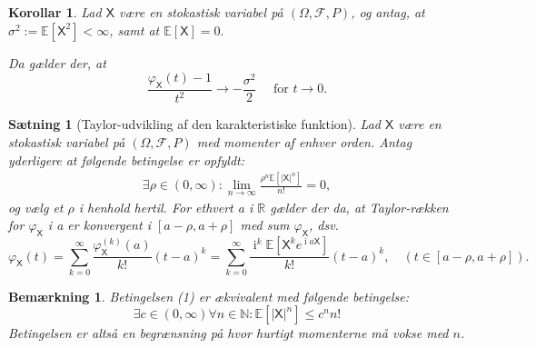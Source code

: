 \documentclass{article}
\newcommand{\N}{\mathbb{N}}
\newcommand{\R}{\mathbb{R}}
\newcommand{\E}{\mathbb{E}}
\newcommand{\1}{\mathbbm{1}}
\newcommand{\X}{\mathsf{X}}
\newcommand{\icomp}{\operatorname{i}}
\newcommand{\varx}{\varphi_\X}
\newcommand{\pfield}{(\Omega, \mathcal{F}, P)}
\newtheorem{corollary}[theorem]{Korollar}
\newtheorem{remark}[theorem]{Bemærkning}
\newtheorem{proposition}[theorem]{Sætning}
\theoremstyle{boxed}
\begin{document}
\begin{theorem-box}
    \begin{corollary}
        Lad $\X$ være en stokastisk variabel på $\pfield$, og antag, at $\sigma^2:=\E[\X^2]<\infty$, samt at $\E[\X]=0.$
        
        Da gælder der, at 
        $$\frac{\varx(t)-1}{t^2}\longrightarrow -\frac{\sigma^2}{2}\quad \text{ for }t\rightarrow 0.$$
    \end{corollary}
\end{theorem-box}
\begin{theorem-box}
    \begin{proposition}[Taylor-udvikling af den karakteristiske funktion]
        Lad $\X$ være en stokastisk variabel på $\pfield$ med momenter af enhver orden. Antag yderligere at følgende betingelse er opfyldt: 
        \begin{align}\exists\rho\in(0,\infty):\lim_{n\rightarrow\infty}\frac{\rho^n\E[|\X|^n]}{n!}=0,\end{align}
        og vælg et $\rho$ i henhold hertil. For ethvert a i $\R$ gælder der da, at Taylor-rækken for $\varx$ i a er konvergent i $[a-\rho, a+\rho]$ med sum $\varx$, dsv.
        $$\varx(t)=\sum_{k=0}^{\infty}\frac{\varx^{(k)}(a)}{k!}(t-a)^k=\sum_{k=0}^{\infty}\frac{\icomp^k\E[\X^ke^{\icomp a\X}]}{k!}(t-a)^k, \quad (t\in[a-\rho, a+\rho]).$$ 
    \end{proposition}
\end{theorem-box}
\begin{remark}
    Betingelsen (1) er ækvivalent med følgende betingelse:
    $$\exists c\in(0,\infty)\forall n\in\N:\E[|\X|^n]\leq c^n n!$$
    Betingelsen er altså en begrænsning på hvor hurtigt momenterne må vokse med $n$.
\end{remark}
\end{document}
